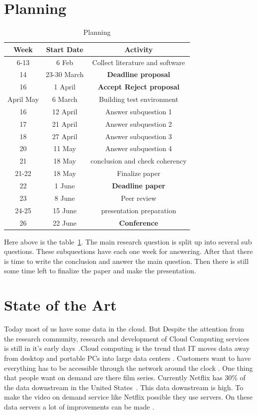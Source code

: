 \documentclass{sig-alternate-br}
\begin{document}
\section{Planning}

\begin{table}[H]
	\centering \caption{Planning}
\begin{tabular}{|c|c|c|} \hline
		\textbf{Week} & \textbf{Start Date} & \textbf{Activity} \\ \hline 
		6-13& 6 Feb& Collect literature and software\\ \hline 	
		14& 23-30 March & \textbf{Deadline proposal} \\ \hline
		16 & 1 April &  \textbf{Accept Reject proposal} \\ \hline
		April May& 6 March& Building test environment \\ \hline
		16& 12 April & Answer subquestion 1  \\ \hline
		17& 21 April & Answer subquestion 2\\ \hline
		18& 27 April & Answer subquestion 3\\ \hline		
		20& 11 May  & Answer subquestion 4 \\ \hline
		21& 18 May & conclusion and check coherency \\ \hline
		21-22& 18 May & Finalize paper \\ \hline
		22& 1 June &  \textbf{Deadline paper} \\ \hline
		23& 8 June & Peer review \\ \hline
		24-25& 15 June & presentation preparation \\ \hline
		26 & 22 June & \textbf{Conference} \\ \hline
		\end{tabular}

		\label{tab:planning}
\end{table}
Here above is the table~\ref{tab:planning}. The main research question is split up into several sub questions. These subquestions have each one week for answering. After that there is time to write the conclusion and answer the main question. Then there is still some time left to finalize the paper and make the presentation. 

\section{State of the Art}
Today most of us have some data in the cloud. But Despite the attention
from the research community, research and development of
Cloud Computing services is still in it's early days~\cite{tso:2013}.Cloud computing is  the trend that IT moves data away from desktop and portable PCs into large data centers \cite{dikaiakos:2009}. Customers want to have everything has to be accessible through the network around the clock \cite{youseff:2008}. One thing that people want on demand are there film series. Currently Netflix has 30\% of the data downstream in the United States~\cite{computer-networking}. This data downstream is high. To make the video on demand service like Netflix possible they use servers. On these data servers a lot of improvements can be made \cite{bennett2007netflix,abrahamsson:2013,beloglazov:2010}. 
\end{document}
